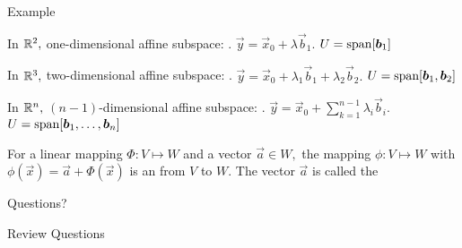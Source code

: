 \documentclass[fleqn,aspectratio=169]{beamer}
\begin{document}
\begin{frame}{Example}

\small
\plitemsep 0.05in
\bci 
\item In ${\mathbb R}^2,$ one-dimensional affine subspace: . $\vec{y} = \vec{x}_0 + \lambda \vec{b}_1.$ $U = \text{span}[\bm{b}_1]$

\item In ${\mathbb R}^3,$ two-dimensional affine subspace: . $\vec{y} = \vec{x}_0 + \lambda_1 \vec{b}_1 + \lambda_2 \vec{b}_2.$ $U = \text{span}[\bm{b}_1, \bm{b}_2]$

\item In ${\mathbb R}^n,$ $(n-1)$-dimensional affine subspace: . $\vec{y} = \vec{x}_0 + \sum_{k=1}^{n-1} \lambda_i \vec{b}_i.$ $U = \text{span}[\bm{b}_1, \ldots, \bm{b}_n]$

\medskip
\begin{center}
\end{center}

\item For a linear mapping $\Phi: V \mapsto W$ and a vector $\vec{a} \in W,$ the mapping $\phi: V \mapsto W$ with $\phi(\vec{x}) = \vec{a} + \Phi(\vec{x})$ is an  from $V$ to $W.$ The vector $\vec{a}$ is called the 
\eci


\end{frame}


\begin{frame}{}
\vspace{2cm}
\LARGE Questions?


\end{frame}

\begin{frame}{Review Questions}
\bce[1)]
\item 

\ece
\end{frame}
\end{document}
